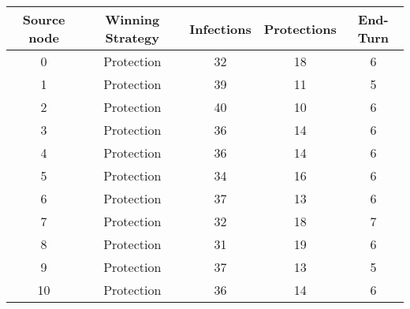 \documentclass[results.tex]{subfiles}
\begin{document}
    \begin{center}
        \begin{tabular}{| c || c | c | c | c |}
            \hline
            {\bfseries Source node} & {\bfseries Winning Strategy} & {\bfseries Infections} & {\bfseries Protections}
            & {\bfseries End-Turn}
            \\  %
            \hline\hline
            0                       & Protection                   & 32                     & 18                      & 6                    \\
            \hline
            1                       & Protection                   & 39                     & 11                      & 5                    \\
            \hline
            2                       & Protection                   & 40                     & 10                      & 6                    \\
            \hline
            3                       & Protection                   & 36                     & 14                      & 6                    \\
            \hline
            4                       & Protection                   & 36                     & 14                      & 6                    \\
            \hline
            5                       & Protection                   & 34                     & 16                      & 6                    \\
            \hline
            6                       & Protection                   & 37                     & 13                      & 6                    \\
            \hline
            7                       & Protection                   & 32                     & 18                      & 7                    \\
            \hline
            8                       & Protection                   & 31                     & 19                      & 6                    \\
            \hline
            9                       & Protection                   & 37                     & 13                      & 5                    \\
            \hline
            10                      & Protection                   & 36                     & 14                      & 6                    \\

\end{tabular}
\end{center}
\end{document}
